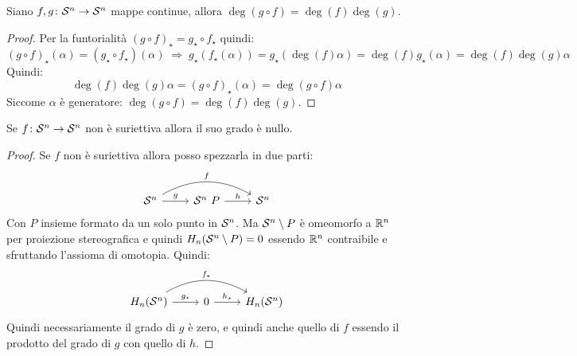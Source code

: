 \begin{proposition}
  Siano $ f,g \colon \mathcal{S}^{n} \to \mathcal{S}^{n} $ mappe continue, allora $ \deg{(g \circ f)} = \deg{(f)} \deg{(g)} $.
\end{proposition}
\begin{proof}
  Per la funtorialità $ (g \circ f)_\star = g_\star \circ f_\star $ quindi:
  \[
    (g \circ f)_\star (\alpha) = (g_\star \circ f_\star)(\alpha) \; \Rightarrow \; g_\star (f_\star (\alpha)) = g_\star(\deg{(f)}\alpha) = \deg{(f)} g_\star(\alpha) = \deg{(f)}\deg{(g)}\alpha
  \]
  Quindi:
  \[
    \deg{(f)}\deg{(g)}\alpha = (g \circ f)_\star (\alpha) = \deg{(g \circ f)} \alpha
  \]
  Siccome $ \alpha $ è generatore: $ \deg{(g \circ f)} = \deg{(f)} \deg{(g)} $.
\end{proof}
\begin{corollary}
  Se $ f \colon \mathcal{S}^{n} \to \mathcal{S}^{n} $ non è suriettiva allora il suo grado è nullo.
\end{corollary}
\begin{proof}
  Se $ f $ non è suriettiva allora posso spezzarla in due parti:
  \[
    \begin{tikzcd}
      \Sph{n} \rar{g} \arrow[bend left]{rr}{f} & \Sph{n} \ P \rar{h} & \Sph{n}
    \end{tikzcd}
  \]
  Con $ P $ insieme formato da un solo punto in $ \mathcal{S}^{n} $. Ma
  $ \mathcal{S}^{n} \setminus P $ è omeomorfo a $ \mathbb{R}^{n} $ per proiezione stereografica e quindi
  $ H_n(\mathcal{S}^{n} \setminus P) = 0 $ essendo $ \mathbb{R}^{n} $ contraibile e sfruttando l'assioma
  di omotopia.
  Quindi:
  \[
    \begin{tikzcd}
      H_n(\Sph{n}) \rar{g_\star} \arrow[bend left]{rr}{f_\star} & 0 \rar{h_\star} & H_n(\Sph{n})
    \end{tikzcd}
  \]
  Quindi necessariamente il grado di $ g $ è zero, e quindi anche quello di
  $ f $ essendo il prodotto del grado di $ g $ con quello di $ h $.
\end{proof}

